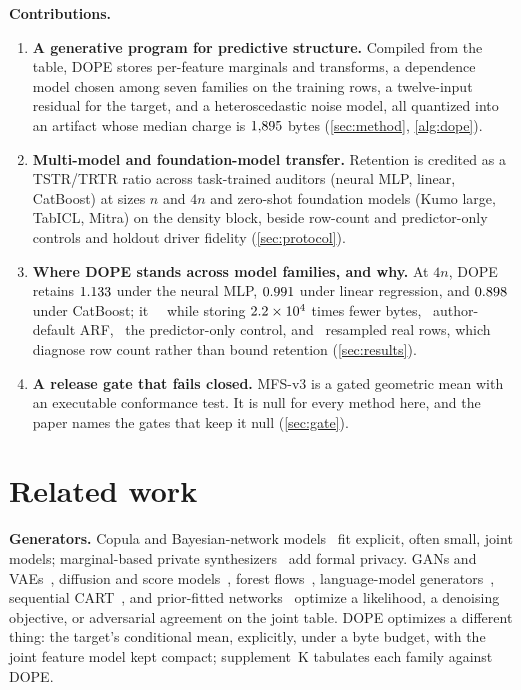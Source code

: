 \documentclass{article} %
\begin{document}
\textbf{Contributions.}
\begin{enumerate}[leftmargin=1.5em,itemsep=1pt,topsep=2pt]
  \item \textbf{A generative program for predictive structure.} Compiled from the table, DOPE stores per-feature marginals and transforms, a dependence model chosen among seven families on the training rows, a twelve-input residual for the target, and a heteroscedastic noise model, all quantized into an artifact whose median charge is $1{,}895$ bytes (\cref{sec:method}, \cref{alg:dope}).
  \item \textbf{Multi-model and foundation-model transfer.} Retention is credited as a TSTR\slash{}TRTR ratio across task-trained auditors (neural MLP, linear, CatBoost) at sizes $n$ and $4n$ and zero-shot foundation models (Kumo large, TabICL, Mitra) on the density block, beside row-count and predictor-only controls and holdout driver fidelity (\cref{sec:protocol}).
  \item \textbf{Where DOPE stands across model families, and why.} At $4n$, DOPE retains $1.133$ under the neural MLP, $0.991$ under linear regression, and $0.898$ under CatBoost; it \VVerdictStrong\ \VStrongestName\ while storing $2.2\times 10^{4}$ times fewer bytes, \VVerdictArfCbFour\ author-default ARF, \VVerdictPredCbFour\ the predictor-only control, and \VVerdictBootCbFour\ resampled real rows, which diagnose row count rather than bound retention (\cref{sec:results}).
  \item \textbf{A release gate that fails closed.} MFS-v3 is a gated geometric mean with an executable conformance test. It is null for every method here, and the paper names the gates that keep it null (\cref{sec:gate}).
\end{enumerate}

\section{Related work}
\label{sec:related}
\textbf{Generators.} Copula and Bayesian-network models~\citep{patki2016sdv,chow1968dependence,aas2009paircopula,zhang2014privbayes} fit explicit, often small, joint models; marginal-based private synthesizers~\citep{mckenna2021mst,mckenna2022aim,cai2021privmrf} add formal privacy. GANs and VAEs~\citep{xu2019ctgan,park2018tablegan,zhao2021ctabgan}, diffusion and score models~\citep{kotelnikov2023tabddpm,zhang2024tabsyn,kim2023stasy,lee2023codi,shi2025tabdiff}, forest flows~\citep{watson2023arf,jolicoeurmartineau2024forestdiffusion}, language-model generators~\citep{borisov2023great,solatorio2023realtabformer}, sequential CART~\citep{nowok2016synthpop}, and prior-fitted networks~\citep{ma2023tabpfgen,hollmann2025tabpfn} optimize a likelihood, a denoising objective, or adversarial agreement on the joint table. DOPE optimizes a different thing: the target's conditional mean, explicitly, under a byte budget, with the joint feature model kept compact; supplement~K tabulates each family against DOPE.
\end{document}
